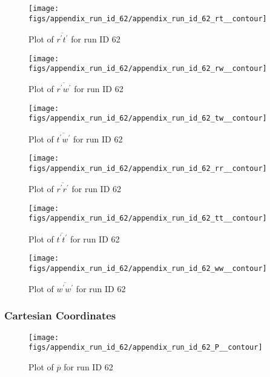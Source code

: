 \begin{figure}[H]
\centering
\texttt{[image: figs/appendix\_run\_id\_62/appendix\_run\_id\_62\_rt\_\_contour]}
\caption{Plot of $\overline{r^\prime t^\prime}$ for run ID 62}
\label{fig:appendix_run_id_62_rt__contour}
\end{figure}


\begin{figure}[H]
\centering
\texttt{[image: figs/appendix\_run\_id\_62/appendix\_run\_id\_62\_rw\_\_contour]}
\caption{Plot of $\overline{r^\prime w^\prime}$ for run ID 62}
\label{fig:appendix_run_id_62_rw__contour}
\end{figure}


\begin{figure}[H]
\centering
\texttt{[image: figs/appendix\_run\_id\_62/appendix\_run\_id\_62\_tw\_\_contour]}
\caption{Plot of $\overline{t^\prime w^\prime}$ for run ID 62}
\label{fig:appendix_run_id_62_tw__contour}
\end{figure}


\begin{figure}[H]
\centering
\texttt{[image: figs/appendix\_run\_id\_62/appendix\_run\_id\_62\_rr\_\_contour]}
\caption{Plot of $\overline{r^\prime r^\prime}$ for run ID 62}
\label{fig:appendix_run_id_62_rr__contour}
\end{figure}


\begin{figure}[H]
\centering
\texttt{[image: figs/appendix\_run\_id\_62/appendix\_run\_id\_62\_tt\_\_contour]}
\caption{Plot of $\overline{t^\prime t^\prime}$ for run ID 62}
\label{fig:appendix_run_id_62_tt__contour}
\end{figure}


\begin{figure}[H]
\centering
\texttt{[image: figs/appendix\_run\_id\_62/appendix\_run\_id\_62\_ww\_\_contour]}
\caption{Plot of $\overline{w^\prime w^\prime}$ for run ID 62}
\label{fig:appendix_run_id_62_ww__contour}
\end{figure}


\subsubsection{Cartesian Coordinates}
\begin{figure}[H]
\centering
\texttt{[image: figs/appendix\_run\_id\_62/appendix\_run\_id\_62\_P\_\_contour]}
\caption{Plot of $\overline{p}$ for run ID 62}
\label{fig:appendix_run_id_62_P__contour}
\end{figure}


